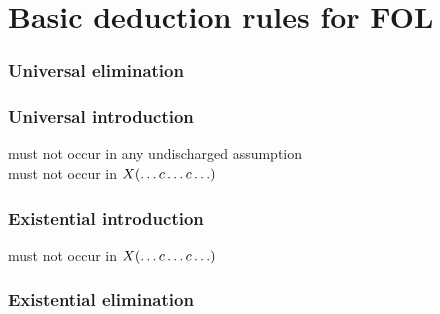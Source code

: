 \section{Basic deduction rules for FOL}

\begin{multicols}{2}
\subsubsection*{Universal elimination}

\begin{fitchproof}
	 
\end{fitchproof}

\subsubsection*{Universal introduction}

\begin{fitchproof}
	 
\end{fitchproof}

\noindent 	{} must not occur in any undischarged assumption\\ 
 must not occur in $X(\ldots c \ldots c\ldots)$


\subsubsection*{Existential introduction}

\begin{fitchproof}
	 
\end{fitchproof}

\noindent {} must not occur in $X(\ldots c \ldots c\ldots)$

\subsubsection*{Existential elimination}


\end{multicols}
